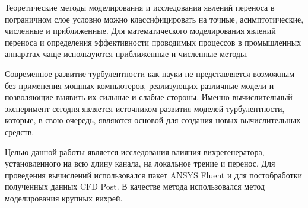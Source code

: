 	Теоретические методы моделирования и исследования явлений переноса в пограничном слое условно можно классифицировать на точные, асимптотические, численные и приближенные. Для математического моделирования явлений переноса и определения эффективности проводимых процессов в промышленных аппаратах чаще используются приближенные и численные методы.
	
	Современное развитие турбулентности как науки не представляется возможным без применения мощных компьютеров, реализующих различные модели и позволяющие выявить их сильные и слабые стороны. Именно вычислительный эксперимент сегодня является источником развития моделей турбулентности, которые, в свою очередь, являются основой для создания новых вычислительных средств.
	
	Целью данной работы является исследования влияния вихрегенератора, установленного на всю длину канала, на локальное трение и перенос. Для проведения вычислений использовался пакет ANSYS Fluent и для постобработки полученных данных CFD Post. В качестве метода использовался метод моделирования крупных вихрей.
\newpage
